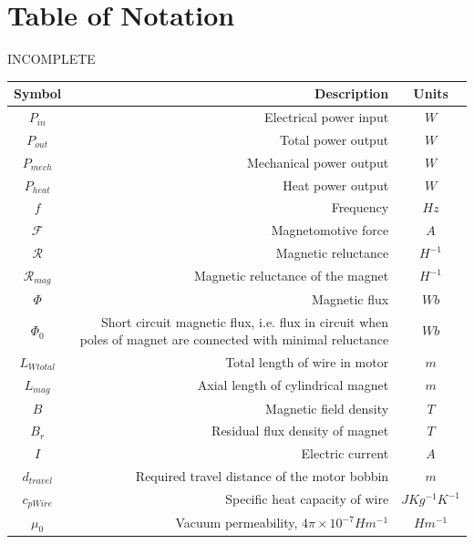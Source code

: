 \documentclass[a4paper,12pt]{article}
\begin{document}
\section{Table of Notation}
INCOMPLETE
\begin{center}
    \begin{tabular}{c | D | c}
        \hline
        \textbf{Symbol} & \textbf{Description} & \textbf{Units} \\ [0.5ex]
        \hline\hline
        $P_{in}$ & Electrical power input & $W$ \\
        \hline
        $P_{out}$ & Total power output & $W$ \\
        \hline
        $P_{mech}$ & Mechanical power output & $W$ \\
        \hline
        $P_{heat}$ & Heat power output & $W$ \\
        \hline
        $f$ & Frequency & $Hz$ \\
        \hline
        $\mathcal{F}$ & Magnetomotive force & $A$ \\
        \hline
        $\mathcal{R}$ & Magnetic reluctance & $H^{-1}$ \\
        \hline
        $\mathcal{R}_{mag}$ & Magnetic reluctance of the magnet & $H^{-1}$ \\
        \hline
        $\Phi$ & Magnetic flux & $Wb$ \\
        \hline
        $\Phi_0$ & Short circuit magnetic flux, i.e. flux in circuit when poles of magnet are connected with minimal reluctance & $Wb$ \\
        \hline
        $L_{Wtotal}$ & Total length of wire in motor & $m$ \\
        \hline
        $L_{mag}$ & Axial length of cylindrical magnet & $m$ \\
        \hline
        $B$ & Magnetic field density & $T$ \\
        \hline
        $B_{r}$ & Residual flux density of magnet & $T$ \\
        \hline
        $I$ & Electric current & $A$ \\
        \hline
        $d_{travel}$ & Required travel distance of the motor bobbin & $m$ \\
        \hline
        $c_{pWire}$ & Specific heat capacity of wire & $JKg^{-1}K^{-1}$ \\
        \hline
        $\mu_0$ & Vacuum permeability, $4\pi\times10^{-7} Hm^{-1}$ \cite{engineeringtoolboxPermeability2016} & $Hm^{-1}$ \\

\end{tabular}
\end{center}
\end{document}
